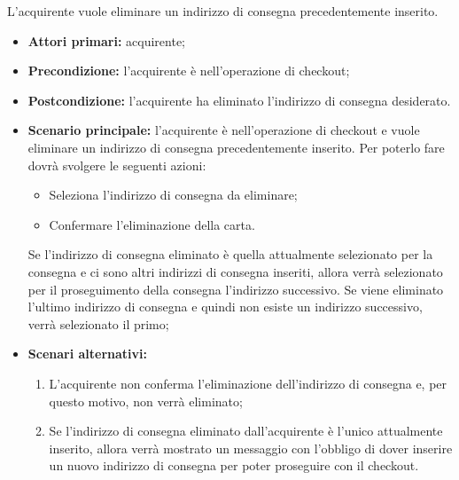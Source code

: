 
L'acquirente vuole eliminare un indirizzo di consegna precedentemente inserito.
\begin{itemize}
    \item \textbf{Attori primari:} acquirente;
    \item \textbf{Precondizione:}  l'acquirente è nell'operazione di checkout;
    \item \textbf{Postcondizione:} l'acquirente ha eliminato l'indirizzo di consegna desiderato.
    \item \textbf{Scenario principale:} l'acquirente è nell'operazione di checkout e vuole eliminare un indirizzo di consegna precedentemente inserito. Per poterlo fare dovrà svolgere le seguenti azioni:
    \begin{itemize}
        \item Seleziona l'indirizzo di consegna da eliminare;
        \item Confermare l'eliminazione della carta.
    \end{itemize}
    Se l'indirizzo di consegna eliminato è quella attualmente selezionato per la consegna e ci sono altri indirizzi di consegna inseriti, allora verrà selezionato per il proseguimento della consegna l'indirizzo successivo. Se viene eliminato l'ultimo indirizzo di consegna e quindi non esiste un indirizzo successivo, verrà selezionato il primo;
    \item \textbf{Scenari alternativi:}
    \begin{enumerate}[label=\lett]
        \item L'acquirente non conferma l'eliminazione dell'indirizzo di consegna e, per questo motivo, non verrà eliminato;
        \item Se l'indirizzo di consegna eliminato dall'acquirente è l'unico attualmente inserito, allora verrà mostrato un messaggio con l'obbligo di dover inserire un nuovo indirizzo di consegna per poter proseguire con il checkout.
    \end{enumerate}
\end{itemize}


